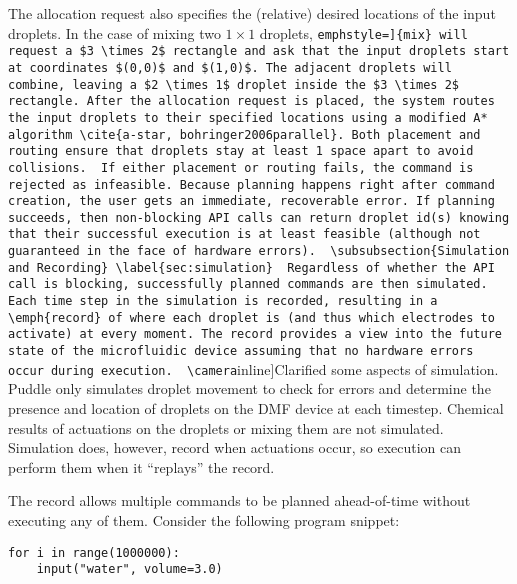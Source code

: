 \documentclass[sigplan, screen]{acmart}
\def\codeinline{\lstinline[emphstyle=]}
\newcommand\camera[2][]{\todo[color=purple!20, #1]{\sf #2}}
\begin{document}
The allocation request also specifies the (relative) desired locations of the input droplets.
In the case of mixing two $1 \times 1$ droplets, \codeinline{mix} will request a $3 \times 2$ rectangle and ask that the input droplets start at coordinates $(0,0)$ and $(1,0)$.
The adjacent droplets will combine, leaving a $2 \times 1$ droplet inside the $3 \times 2$ rectangle.
After the allocation request is placed, the system routes the input droplets to their specified locations using a modified A* algorithm \cite{a-star, bohringer2006parallel}.
Both placement and routing ensure that droplets stay at least 1 space apart to avoid collisions.

If either placement or routing fails, the command is rejected as infeasible.
Because planning happens right after command creation, the user gets an immediate, recoverable error.
If planning succeeds, then non-blocking API calls can return droplet id(s) knowing that their successful execution is at least feasible (although not guaranteed in the face of hardware errors).

\subsubsection{Simulation and Recording}
\label{sec:simulation}

Regardless of whether the API call is blocking, successfully planned commands are then simulated.
Each time step in the simulation is recorded, resulting in a \emph{record} of where each droplet is (and thus which electrodes to activate) at every moment.
The record provides a view into the future state of the microfluidic device assuming that no hardware errors occur during execution.

\camera[inline]{Clarified some aspects of simulation.}
Puddle only simulates droplet movement to check for errors and determine the presence and location of droplets on the DMF device at each timestep.
Chemical results of actuations on the droplets or mixing them are not simulated.
Simulation does, however, record when actuations occur, so execution can perform them when it ``replays'' the record.

The record allows multiple commands to be planned ahead-of-time without executing any of them.
Consider the following program snippet:

\begin{lstlisting}[emphstyle=\underline, numbers=none, xleftmargin=15mm]
for i in range(1000000):
    input("water", volume=3.0)
\end{lstlisting}
\end{document}
